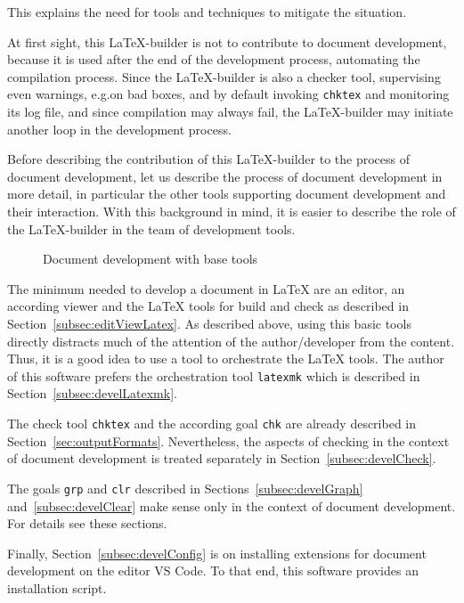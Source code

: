 This explains the need for tools and techniques to mitigate the situation. 

At first sight, this \LaTeX-builder is not to contribute to document development, 
because it is used after the end of the development process, 
automating the compilation process. 
Since the \LaTeX-builder is also a checker tool, 
supervising even warnings, e.g.\@ on bad boxes, and by default invoking \texttt{chktex} 
and monitoring its log file, and since compilation may always fail, 
the \LaTeX-builder may initiate another loop in the development process. 

Before describing the contribution of this \LaTeX-builder 
to the process of document development, 
let us describe the process of document development in more detail, 
in particular the other tools supporting document development and their interaction. 
With this background in mind, it is easier to describe the role of the \LaTeX-builder 
in the team of development tools. 

\begin{figure}
  \centering
  \caption{\label{fig:docDevelBase}Document development with base tools}
\end{figure}

The minimum needed to develop a document in \LaTeX{} 
are an editor, an according viewer and the \LaTeX{} tools for build and check 
as described in Section~\ref{subsec:editViewLatex}. 
As described above, using this basic tools directly 
distracts much of the attention of the author/developer 
from the content. 
Thus, it is a good idea to use a tool to orchestrate the \LaTeX{} tools. 
The author of this software prefers the orchestration tool \texttt{latexmk} 
which is described in Section~\ref{subsec:develLatexmk}. 

The check tool \texttt{chktex} and the according goal \texttt{chk} 
are already described in Section~\ref{sec:outputFormats}. 
Nevertheless, the aspects of checking 
in the context of document development is treated separately 
in Section~\ref{subsec:develCheck}. 

The goals \texttt{grp} and \texttt{clr} 
described in Sections~\ref{subsec:develGraph} and~\ref{subsec:develClear} 
make sense only in the context of document development. 
For details see these sections. 

Finally, Section~\ref{subsec:develConfig} 
is on installing extensions for document development on the editor VS Code. 
To that end, this software provides an installation script. 


